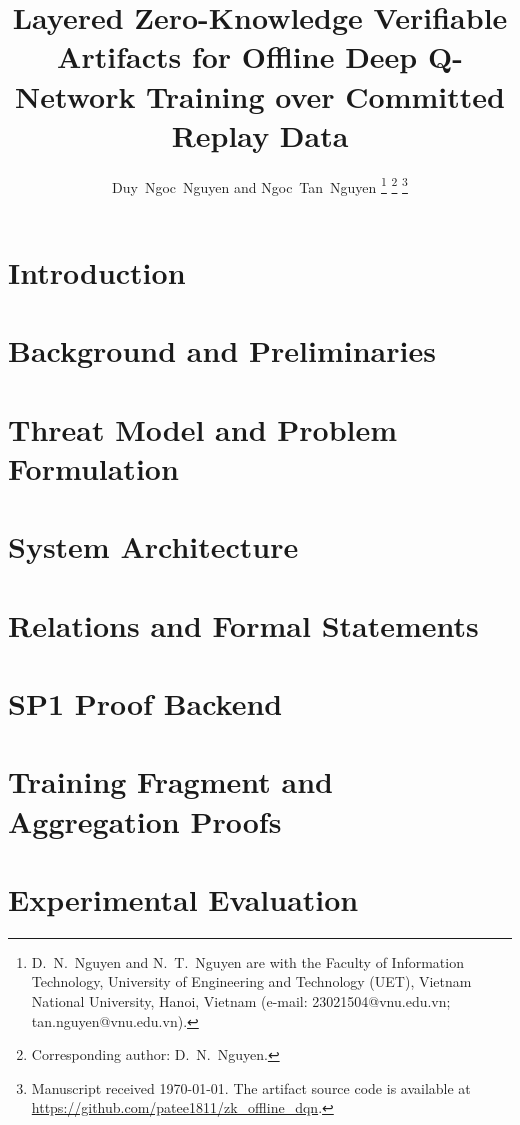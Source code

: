 \documentclass[journal]{IEEEtran}
\title{Layered Zero-Knowledge Verifiable Artifacts for Offline Deep Q-Network Training over Committed Replay Data}
\author{Duy~Ngoc~Nguyen and Ngoc~Tan~Nguyen%
\thanks{D.~N.~Nguyen and N.~T.~Nguyen are with the Faculty of Information Technology, University of Engineering and Technology (UET), Vietnam National University, Hanoi, Vietnam (e-mail: 23021504@vnu.edu.vn; tan.nguyen@vnu.edu.vn).}%
\thanks{Corresponding author: D.~N.~Nguyen.}%
\thanks{Manuscript received \today. The artifact source code is available at \url{https://github.com/patee1811/zk_offline_dqn}.}}
\begin{document}
\maketitle



\section{Introduction}\label{sec:introduction}


\section{Background and Preliminaries}\label{sec:background}


\section{Threat Model and Problem Formulation}\label{sec:threat-model}


\section{System Architecture}\label{sec:system-overview}


\section{Relations and Formal Statements}\label{sec:relations}



\section{SP1 Proof Backend}\label{sec:proof-backend}


\section{Training Fragment and Aggregation Proofs}\label{sec:training-fragment}


\section{Experimental Evaluation}\label{sec:experiments}

\end{document}
